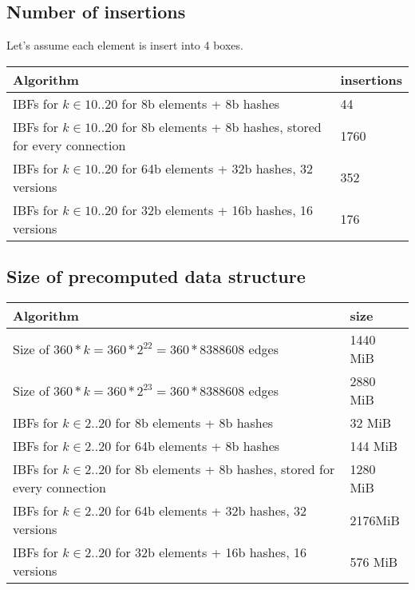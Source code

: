 \documentclass[11pt]{article}
\begin{document}
\subsection{Number of insertions}
Let's assume each element is insert into 4 boxes.

\begin{tabular}{ | l | l | }
    \hline
    Algorithm & insertions \\ \hline
    IBFs for $k \in 10..20$ for 8b elements + 8b hashes & 44  \\
    IBFs for $k \in 10..20$ for 8b elements + 8b hashes, stored for every connection & 1760  \\
    IBFs for $k \in 10..20$ for 64b elements + 32b hashes, 32 versions & 352 \\
    IBFs for $k \in 10..20$ for 32b elements + 16b hashes, 16 versions & 176 \\ \hline
\end{tabular}


\subsection{Size of precomputed data structure}

\begin{tabular}{ | l | l | }
    \hline
    Algorithm & size \\ \hline
    Size of  $360 * k  = 360 * 2^{22} = 360 * 8388608$ edges & 1440 MiB \\
    Size of  $360 * k  = 360 * 2^{23} = 360 * 8388608$ edges & 2880 MiB \\
    IBFs for $k \in 2..20$ for 8b elements + 8b hashes & 32 MiB \\
    IBFs for $k \in 2..20$ for 64b elements + 8b hashes & 144 MiB \\
    IBFs for $k \in 2..20$ for 8b elements + 8b hashes, stored for every connection & 1280 MiB  \\
    IBFs for $k \in 2..20$ for 64b elements + 32b hashes, 32 versions & 2176MiB  \\
    IBFs for $k \in 2..20$ for 32b elements + 16b hashes, 16 versions & 576 MiB  \\ \hline
\end{tabular}
\end{document}
